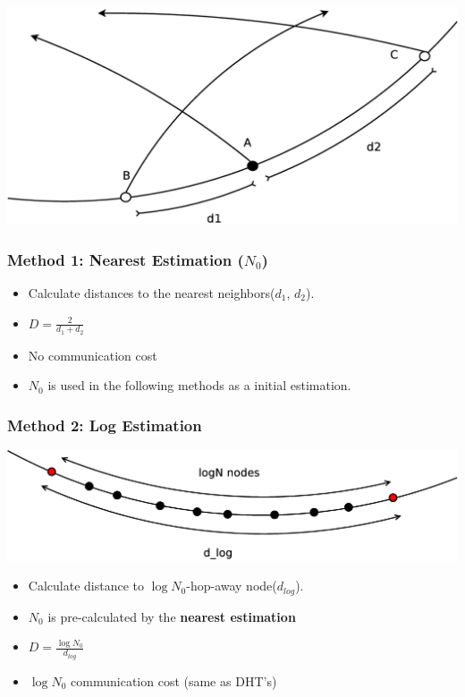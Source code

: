 \documentclass[red]{beamer}
\begin{document}
\begin{frame}
\centering
\includegraphics[scale=0.15]{figs/method1}
\frametitle{Method 1: Nearest Estimation ($N_0$)}
\begin{itemize}
\item Calculate distances to the nearest neighbors($d_1$, $d_2$). 
\item $D = \frac{2}{d_1+d_2}$
\item No communication cost
\item $N_0$ is used in the following methods as a initial estimation.
\end{itemize}
\end{frame}
\begin{frame}
\frametitle{Method 2: Log Estimation}
\centering
\includegraphics[scale=0.2]{figs/method2}
\begin{itemize}
\item Calculate distance to $\log{N_0}$-hop-away node($d_{log}$).
\item $N_0$ is pre-calculated by the \textbf{nearest estimation}
\item $D = \frac{\log{N_0}}{d_{log}}$
\item $\log{N_0}$ communication cost (same as DHT's)
\end{itemize}
\end{frame}
\end{document}

